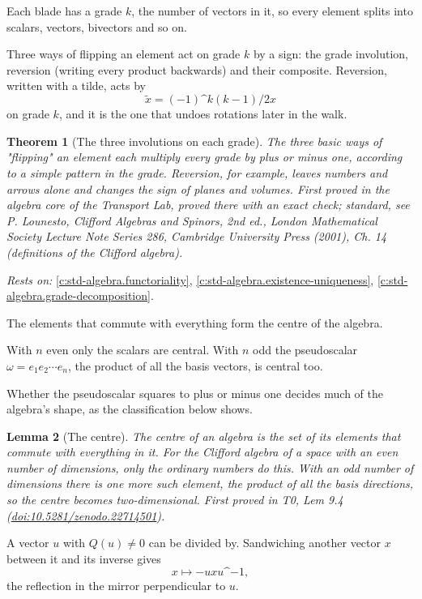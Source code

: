 \documentclass[11pt]{article}
\newtheorem{theorem}{Theorem}[section]
\newtheorem{lemma}[theorem]{Lemma}
\theoremstyle{definition}
\theoremstyle{plain}
\begin{document}
Each blade has a grade $k$, the number of vectors in it, so every element splits into scalars, vectors, bivectors and so on.

Three ways of flipping an element act on grade $k$ by a sign: the grade involution, reversion (writing every product backwards) and their composite. Reversion, written with a tilde, acts by \[ \tilde{x} = (-1)\^{}{k(k-1)/2} x \] on grade $k$, and it is the one that undoes rotations later in the walk.

\begin{theorem}[The three involutions on each grade]\label{c:std-algebra.involution-properties}
The three basic ways of "flipping" an element each multiply every grade by plus or minus one, according to a simple pattern in the grade. Reversion, for example, leaves numbers and arrows alone and changes the sign of planes and volumes.
\emph{First proved in} the algebra core of the Transport Lab, proved there with an exact check; standard, see P. Lounesto, Clifford Algebras and Spinors, 2nd ed., London Mathematical Society Lecture Note Series 286, Cambridge University Press (2001), Ch. 14 (definitions of the Clifford algebra).
\end{theorem}
\noindent\emph{Rests on:} \ref{c:std-algebra.functoriality}, \ref{c:std-algebra.existence-uniqueness}, \ref{c:std-algebra.grade-decomposition}.

The elements that commute with everything form the centre of the algebra.

With $n$ even only the scalars are central. With $n$ odd the pseudoscalar $\omega = e_1 e_2 \cdots e_n$, the product of all the basis vectors, is central too.

Whether the pseudoscalar squares to plus or minus one decides much of the algebra's shape, as the classification below shows.

\begin{lemma}[The centre]\label{c:primer.centre}
The centre of an algebra is the set of its elements that commute with everything in it. For the Clifford algebra of a space with an even number of dimensions, only the ordinary numbers do this. With an odd number of dimensions there is one more such element, the product of all the basis directions, so the centre becomes two-dimensional.
\emph{First proved in} T0, Lem 9.4 (\href{https://doi.org/10.5281/zenodo.22714501}{doi:10.5281/zenodo.22714501}).
\end{lemma}

A vector $u$ with $Q(u) \ne 0$ can be divided by. Sandwiching another vector $x$ between it and its inverse gives \[ x \mapsto -u x u\^{}{-1}, \] the reflection in the mirror perpendicular to $u$.
\end{document}
